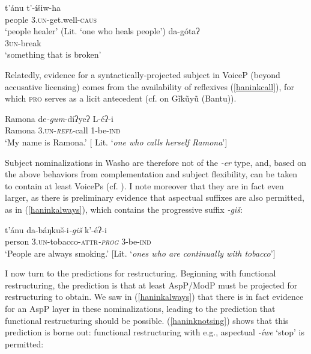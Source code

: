 \documentclass[output=paper]{langscibook}
\begin{document}
\ea \gll t'ánu t'-íšiw-ha\\
people 3.\textsc{un}-get.well-{\scshape caus}\\
\glt `people healer' (Lit. `one who heals people') \label{haninkhealer}
\ex \gll da-gótaʔ\\
\textsc{3{\scshape un}}-{break}\\
\glt `something that is broken' \label{haninkbroken}
\z 

\noindent Relatedly, evidence for a syntactically-projected subject in VoiceP (beyond accusative licensing) comes from the availability of reflexives (\ref{haninkcall}), for which {\scshape pro} serves as a licit antecedent (cf. \citealt{bakervinokurova2009} on Gĩkũyũ (Bantu)). 

\ea \gll Ramona de{\itshape -gum}-díʔyeʔ L-éʔ-i\\
Ramona {\scshape 3.{\scshape un}}-\textit{\textsc{refl}}-call 1-be-{\scshape ind}\\
\glt `My name is Ramona.' $[$ Lit. `{\itshape one who calls herself Ramona}'$]$ \label{haninkcall}
\z

Subject nominalizations in Washo are therefore not of the {\itshape -er} type, and, based on the above behaviors from complementation and subject flexibility, can be taken to contain at least VoicePs (cf.  \citealt{bochnaketal2011}). I note moreover that they are in fact even larger, as there is preliminary evidence that aspectual suffixes are also permitted, as in (\ref{haninkalways}), which contains the progressive suffix {\itshape -giš}:%

 \ea \gll t'ánu da-báŋkuš-i{\itshape-giš} k'-é{ʔ}-i\\
person {\scshape 3.un}-tobacco-{\scshape attr}\textit{\textsc{-prog}} 3-be-{\scshape ind}\\
\glt `People are always smoking.' $[$Lit. `{\itshape ones who are continually with tobacco}'$]$ \label{haninkalways}
\z



I now turn to the predictions for restructuring. Beginning with functional restructuring, the prediction is that at least AspP/ModP must be projected for restructuring to obtain. We saw in (\ref{haninkalways}) that there is in fact evidence for an AspP layer in these nominalizations, leading to the prediction that functional restructuring should be possible. (\ref{haninknotsing}) shows that this prediction is borne out: functional restructuring with e.g., aspectual {\itshape -íwe} `stop' is permitted:
\end{document}
